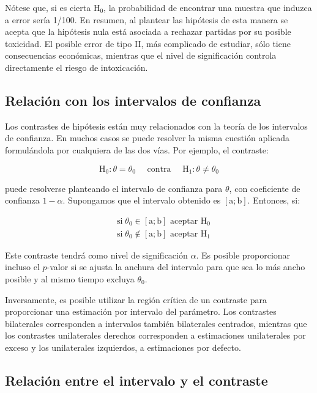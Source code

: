\documentclass[
]{article}
\begin{document}
Nótese que, si es cierta \(\mathrm{H}_{0}\), la probabilidad de encontrar una muestra que induzca a error sería 1/100.
En resumen, al plantear las hipótesis de esta manera se acepta que la hipótesis nula está asociada a rechazar partidas por su posible toxicidad. El posible error de tipo II, más complicado de estudiar, sólo tiene consecuencias económicas, mientras que el nivel de significación controla directamente el riesgo de intoxicación.

\subsection{Relación con los intervalos de confianza}\label{relaciuxf3n-con-los-intervalos-de-confianza-1}

Los contrastes de hipótesis están muy relacionados con la teoría de los intervalos de confianza. En muchos casos se puede resolver la misma cuestión aplicada formulándola por cualquiera de las dos vías. Por ejemplo, el contraste:

\[
\mathrm{H}_{0}: \theta=\theta_{0} \quad \text { contra } \quad \mathrm{H}_{1}: \theta \neq \theta_{0}
\]

puede resolverse planteando el intervalo de confianza para \(\theta\), con coeficiente de confianza \(1-\alpha\). Supongamos que el intervalo obtenido es \([\mathrm{a} ; \mathrm{b}]\). Entonces, si:

\[
\begin{aligned}
& \operatorname{si} \theta_{0} \in[\mathrm{a} ; \mathrm{b}] \text { aceptar } \mathrm{H}_{0} \\
& \operatorname{si} \theta_{0} \notin[\mathrm{a} ; \mathrm{b}] \text { aceptar } \mathrm{H}_{1}
\end{aligned}
\]

Este contraste tendrá como nivel de significación \(\alpha\). Es posible proporcionar incluso el \(p\)-valor si se ajusta la anchura del intervalo para que sea lo más ancho posible y al mismo tiempo excluya \(\theta_{0}\).

Inversamente, es posible utilizar la región crítica de un contraste para proporcionar una estimación por intervalo del parámetro. Los contrastes bilaterales corresponden a intervalos también bilaterales centrados, mientras que los contrastes unilaterales derechos corresponden a estimaciones unilaterales por exceso y los unilaterales izquierdos, a estimaciones por defecto.

\subsection{Relación entre el intervalo y el contraste}\label{relaciuxf3n-entre-el-intervalo-y-el-contraste}
\end{document}
